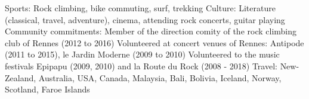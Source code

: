 \begin{cvskills}
  \cvskill
    {Sports:}
	{Rock climbing, bike commuting, surf, trekking}
  \cvskill
    {Culture:}
	{
        Literature (classical, travel, adventure), cinema, attending rock
        concerts, guitar playing
	}
  \cvskill
    {Community commitments:}
	{
        Member of the direction comity of the rock climbing club of Rennes
        (2012 to 2016)\newline
        Volunteered at concert venues of Rennes: Antipode (2011 to 2015), le
        Jardin Moderne (2009 to 2010)\newline
        Volunteered to the music festivals Epipapu (2009, 2010) and la Route du
        Rock (2008 - 2018)
    }
  \cvskill
    {Travel:}
    {New-Zealand, Australia, USA, Canada, Malaysia, Bali, Bolivia, Iceland,
    Norway, Scotland, Faroe Islands}
\end{cvskills}
